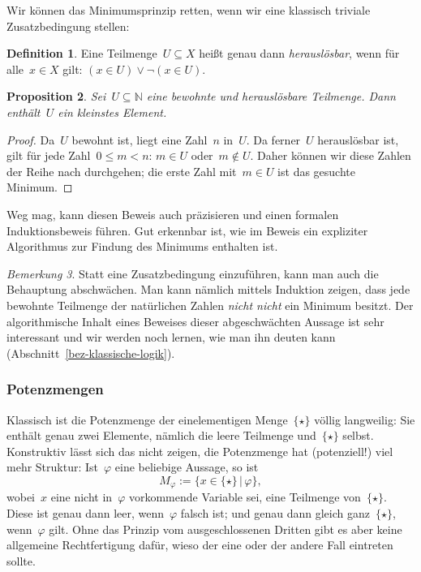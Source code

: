\documentclass[a4paper,ngerman,12pt]{scrartcl}
\theoremstyle{definition}
\newtheorem{defn}{Definition}[section]
\theoremstyle{plain}
\newtheorem{prop}[defn]{Proposition}
\theoremstyle{remark}
\newtheorem{bem}[defn]{Bemerkung}
\newcommand{\NN}{\mathbb{N}}
\renewcommand{\_}{\mathpunct{.}\,}
\newcommand{\?}{\,{:}\,}
\begin{document}
Wir können das Minimumsprinzip retten, wenn wir eine klassisch triviale
Zusatzbedingung stellen:
\begin{defn}Eine Teilmenge~$U \subseteq X$ heißt genau dann
\emph{herauslösbar}, wenn für alle~$x \in X$ gilt: $(x \in U) \vee \neg(x \in
U)$.\end{defn}
\begin{prop}Sei~$U \subseteq \NN$ eine bewohnte und herauslösbare Teilmenge.
Dann enthält~$U$ ein kleinstes Element.\end{prop}
\begin{proof}Da~$U$ bewohnt ist, liegt eine Zahl~$n$ in~$U$. Da ferner~$U$
herauslösbar ist, gilt für jede Zahl~$0 \leq m < n$: $m \in U$ oder~$m \not\in
U$. Daher können wir diese Zahlen der Reihe nach durchgehen; die erste Zahl
mit~$m \in U$ ist das gesuchte Minimum.
\end{proof}
Weg mag, kann diesen Beweis auch präzisieren und einen formalen
Induktionsbeweis führen. Gut erkennbar ist, wie im Beweis ein expliziter
Algorithmus zur Findung des Minimums enthalten ist.

\begin{bem}Statt eine Zusatzbedingung einzuführen, kann man auch die Behauptung
abschwächen. Man kann nämlich mittels Induktion zeigen, dass jede
bewohnte Teilmenge der natürlichen Zahlen \emph{nicht nicht} ein Minimum
besitzt. Der algorithmische Inhalt eines Beweises dieser abgeschwächten Aussage
ist sehr interessant und wir werden noch lernen, wie man ihn deuten kann
(Abschnitt~\ref{bez-klassische-logik}).\end{bem}


\subsubsection*{Potenzmengen}

Klassisch ist die Potenzmenge der einelementigen Menge~$\{\star\}$ völlig
langweilig: Sie enthält genau zwei Elemente, nämlich die leere Teilmenge
und~$\{\star\}$ selbst. Konstruktiv lässt sich das nicht zeigen, die
Potenzmenge hat (potenziell!) viel mehr Struktur: Ist~$\varphi$ eine beliebige
Aussage, so ist
\[ M_\varphi := \{ x \in \{\star\} \,|\, \varphi \}, \]
wobei~$x$ eine nicht in~$\varphi$ vorkommende Variable sei, eine Teilmenge
von~$\{\star\}$. Diese ist genau dann leer, wenn~$\varphi$ falsch ist; und
genau dann gleich ganz~$\{\star\}$, wenn~$\varphi$ gilt. Ohne das Prinzip vom
ausgeschlossenen Dritten gibt es aber keine allgemeine Rechtfertigung dafür,
wieso der eine oder der andere Fall eintreten sollte.
\end{document}
